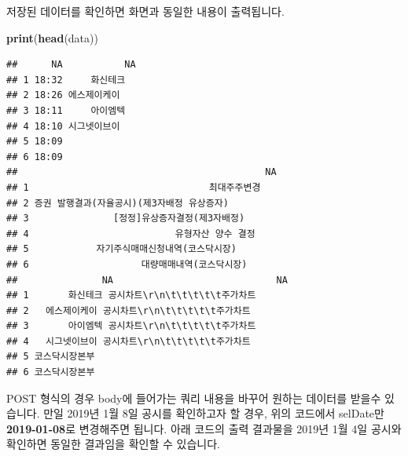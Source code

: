 \documentclass[12pt,]{book}
\newenvironment{Shaded}{\begin{snugshade}}{\end{snugshade}}
\newcommand{\KeywordTok}[1]{\textcolor[rgb]{0.13,0.29,0.53}{\textbf{#1}}}
\newcommand{\NormalTok}[1]{#1}
\begin{document}
저장된 데이터를 확인하면 화면과 동일한 내용이 출력됩니다.

\begin{Shaded}
\begin{Highlighting}[]
\KeywordTok{print}\NormalTok{(}\KeywordTok{head}\NormalTok{(data))}
\end{Highlighting}
\end{Shaded}

\begin{verbatim}
##      NA           NA
## 1 18:32     화신테크
## 2 18:26 에스제이케이
## 3 18:11     아이엠텍
## 4 18:10 시그넷이브이
## 5 18:09             
## 6 18:09             
##                                            NA
## 1                                최대주주변경
## 2 증권 발행결과(자율공시)(제3자배정 유상증자)
## 3               [정정]유상증자결정(제3자배정)
## 4                          유형자산 양수 결정
## 5            자기주식매매신청내역(코스닥시장)
## 6                    대량매매내역(코스닥시장)
##               NA                             NA
## 1       화신테크 공시차트\r\n\t\t\t\t\t주가차트
## 2   에스제이케이 공시차트\r\n\t\t\t\t\t주가차트
## 3       아이엠텍 공시차트\r\n\t\t\t\t\t주가차트
## 4   시그넷이브이 공시차트\r\n\t\t\t\t\t주가차트
## 5 코스닥시장본부                               
## 6 코스닥시장본부
\end{verbatim}

POST 형식의 경우 body에 들어가는 쿼리 내용을 바꾸어 원하는 데이터를 받을수 있습니다. 만일 2019년 1월 8일 공시를 확인하고자 할 경우, 위의 코드에서 selDate만 \textbf{2019-01-08}로 변경해주면 됩니다. 아래 코드의 출력 결과물을 2019년 1월 4일 공시와 확인하면 동일한 결과임을 확인할 수 있습니다.
\end{document}
